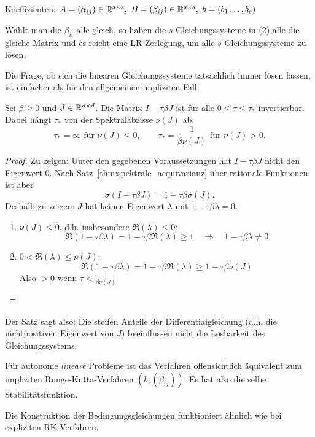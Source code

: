 Koeffizienten: $A=(\alpha_{ij})\in\R^{s\times s},\ B=(\beta_{ij})\in\R^{s\times s},\  b=(b_1\hdots,b_s)$

Wählt man die $\beta_{ii}$ alle gleich, so haben die $s$ Gleichungssysteme in (2) alle die gleiche Matrix und es reicht eine LR-Zerlegung, um alle $s$ Gleichungssysteme zu lösen.

Die Frage, ob sich die linearen Gleichungssysteme tatsächlich immer lösen lassen, ist einfacher als für den allgemeinen impliziten Fall:
\begin{lemma}
	Sei $\beta \geq 0$ und $J\in\mathbb R^{d\times d}$. Die Matrix $I-\tau\beta J$ ist für alle $0\leq \tau\leq \tau_*$ invertierbar. Dabei hängt $\tau_*$ von der Spektralabzisse $\nu(J)$ ab:
	\begin{equation*}
	\tau_* = \infty\text{ für } \nu(J)\leq 0, \qquad \tau_* =  \frac{1}{\beta\nu(J)} \text{ für }	\nu(J) > 0.
	\end{equation*}
\end{lemma}
\begin{proof}
	Zu zeigen: Unter den gegebenen Voraussetzungen hat $I-\tau\beta J$ nicht den Eigenwert $0$. Nach Satz~\eqref{thm:spektrale_aequivarianz} über rationale Funktionen ist aber
	\begin{equation*}
	\sigma(I-\tau\beta J) = 1-\tau\beta\sigma(J).
	\end{equation*}
	Deshalb zu zeigen: $J$ hat keinen Eigenwert $\lambda$ mit $1-\tau\beta\lambda = 0$.\\
	\begin{enumerate}[label=Fall \arabic*:, leftmargin=*]
		\item $\nu(J) \leq 0$, d.h. insbesondere $\Re(\lambda)\leq 0$:
		\begin{equation*}
		\Re(1-\tau\beta\lambda) = 1-\tau\beta \Re(\lambda) \geq 1 \quad  \Rightarrow \quad 1-\tau\beta\lambda \neq 0
		\end{equation*}
		\item $0<\Re(\lambda)\leq \nu(J)$:
		\begin{equation*}
		\Re(1-\tau\beta\lambda) = 1 - \tau \beta \Re(\lambda) \geq 1 - \tau\beta\nu(J)
		\end{equation*}
		Also $>0$ wenn $\tau < \frac{1}{\beta\nu(J)}$
	\end{enumerate}
\end{proof}

Der Satz sagt also: Die steifen Anteile der Differentialgleichung (d.h. die nichtpositiven Eigenwert von $J$) beeinflussen nicht die Lösbarkeit des Gleichungssystems.

Für autonome \textit{lineare} Probleme ist das Verfahren offensichtlich äquivalent zum impliziten Runge-Kutta-Verfahren $(b, (\beta_{ij}))$.  Es hat also die selbe Stabilitätsfunktion.

Die Konstruktion der Bedingungsgleichungen funktioniert ähnlich wie bei expliziten RK-Verfahren.
